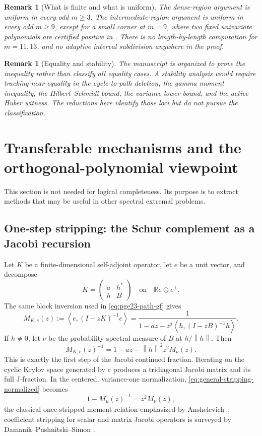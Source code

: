 \documentclass[11pt]{article}
\newtheorem{remark}[theorem]{Remark}
\numberwithin{equation}{section}
\newcommand{\R}{\mathbb R}
\newcommand{\ip}[2]{\left\langle #1,#2\right\rangle}
\newcommand{\norm}[1]{\left\lVert #1\right\rVert}
\begin{document}
\begin{remark}[What is finite and what is uniform]
  The dense-region argument is uniform in every odd $m\ge3$.
  The intermediate-region argument is uniform in every odd $m\ge9$, except for a small corner at $m=9$, where two fixed univariate polynomials are certified positive in .
  There is no length-by-length computation for $m=11,13$, and no adaptive interval subdivision anywhere in the proof.
\end{remark}

\begin{remark}[Equality and stability]
  The manuscript is organized to prove the inequality rather than classify all equality cases.
  A stability analysis would require tracking near-equality in the cycle-to-path deletion, the gamma moment inequality, the Hilbert--Schmidt bound, the variance lower bound, and the active Huber witness.
  The reductions here identify those loci but do not pursue the classification.
\end{remark}

\section{Transferable mechanisms and the orthogonal-polynomial viewpoint}
\label{sec:transferable}

This section is not needed for logical completeness.
Its purpose is to extract methods that may be useful in other spectral extremal problems.

\subsection{One-step stripping: the Schur complement as a Jacobi recursion}

Let $K$ be a finite-dimensional self-adjoint operator, let $e$ be a unit vector, and decompose
\[
  K=\begin{pmatrix}a&h^*\\h&B\end{pmatrix}
  \quad\text{on}\quad \R e\oplus e^\perp.
\]
The same block inversion used in \eqref{eq:pge23-path-gf} gives
\begin{equation}\label{eq:general-stripping}
  M_{K,e}(z):=\ip e{(I-zK)^{-1}e}
  =\frac{1}{1-az-z^2\ip h{(I-zB)^{-1}h}}.
\end{equation}
If $h\ne0$, let $\nu$ be the probability spectral measure of $B$ at $h/\norm h$.
Then
\begin{equation}\label{eq:general-stripping-normalized}
  M_{K,e}(z)^{-1}
  =1-az-\norm h^2z^2M_\nu(z).
\end{equation}
This is exactly the first step of the Jacobi continued fraction.
Iterating on the cyclic Krylov space generated by $e$ produces a tridiagonal Jacobi matrix and its full J-fraction.
In the centered, variance-one normalization, \eqref{eq:general-stripping-normalized} becomes
\[
  1-M_\mu(z)^{-1}=z^2M_\nu(z),
\]
the classical once-stripped moment relation emphasized by Anshelevich~\cite{Anshelevich2009}; coefficient stripping for scalar and matrix Jacobi operators is surveyed by Damanik--Pushnitski--Simon \cite{DamanikPushnitskiSimon2008}.
\end{document}
